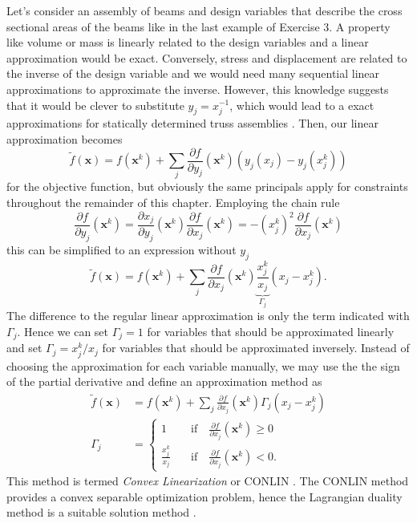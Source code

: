 Let's consider an assembly of beams and design variables that describe the cross sectional areas of the beams like in the last example of Exercise 3. A property like volume or mass is linearly related to the design variables and a linear approximation would be exact. Conversely, stress and displacement are related to the inverse of the design variable and we would need many sequential linear approximations to approximate the inverse.  However, this knowledge suggests that it would be clever to substitute $y_j = x^{-1}_j$, which would lead to a exact approximations for statically determined truss assemblies \cite{Christensen2008}. 
Then, our linear approximation becomes 
\begin{equation}
    \tilde{f}(\mathbf{x}) = f(\mathbf{x}^k) + \sum_j \frac{\partial f}{\partial y_j}(\mathbf{x}^k) \left(y_j(x_j) - y_j(x^k_j) \right)
\end{equation}
for the objective function, but obviously the same principals apply for constraints throughout the remainder of this chapter.
Employing the chain rule
\begin{equation}
    \frac{\partial f}{\partial y_j} (\mathbf{x}^k) 
    = \frac{\partial x_j}{\partial y_j}(\mathbf{x}^k) \frac{\partial f}{\partial x_j} (\mathbf{x}^k)   
    = -(x^k_j)^2 \frac{\partial f}{\partial x_j}(\mathbf{x}^k) 
\end{equation}
this can be simplified to an expression without $y_j$
\begin{equation}
    \tilde{f}(\mathbf{x}) = f(\mathbf{x}^k) + \sum_j \frac{\partial f}{\partial x_j}(\mathbf{x}^k) \underbrace{\frac{x^k_j}{x_j}}_{\Gamma_j} \left(x_j - x^k_j \right). 
\end{equation}
The difference to the regular linear approximation is only the term indicated with $\Gamma_j$. Hence we can set $\Gamma_j = 1$ for variables that should be approximated linearly and set $\Gamma_j = x^k_j / x_j$ for variables that should be approximated inversely. Instead of choosing the approximation for each variable manually, we may use the the sign of the partial derivative and define an approximation method as 
\begin{align}
    \tilde{f}(\mathbf{x}) &= f(\mathbf{x}^k) + \sum_j \frac{\partial f}{\partial x_j}(\mathbf{x}^k) \Gamma_j \left(x_j - x^k_j \right) \\
    \Gamma_j &= 
    \begin{cases}
        1 &\quad \text{if} \quad \frac{\partial f}{\partial x_j} (\mathbf{x}^k) \ge 0 \\
        \frac{x^k_j}{x_j} &\quad \text{if} \quad \frac{\partial f}{\partial x_j} (\mathbf{x}^k) < 0.
    \end{cases}
\end{align}
This method is termed \emph{Convex Linearization} or CONLIN \cite{Fleury1989}. The CONLIN method provides a convex separable optimization problem, hence the Lagrangian duality method is a suitable solution method  \cite{Christensen2008,Harzheim2014}.


